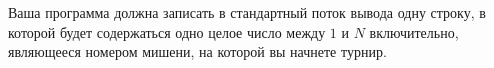 Ваша программа должна записать в стандартный поток вывода одну строку, в которой будет
содержаться одно целое число между $1$ и $N$ включительно, являющееся номером мишени, на
которой вы начнете турнир.
